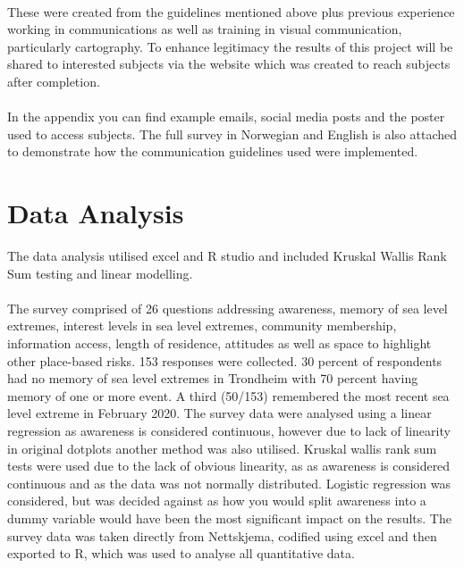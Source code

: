 \paragraph{}
These were created from the guidelines mentioned above plus previous experience working in communications as well as training in visual communication, particularly cartography. To enhance legitimacy the results of this project will be shared to interested subjects via the website which was created to reach subjects after completion. 
\paragraph{}
In the appendix you can find example emails, social media posts and the poster used to access subjects. The full survey in Norwegian and English is also attached to demonstrate how the communication guidelines used were implemented.
\paragraph{}


\section{Data Analysis}
 The data analysis utilised excel and R studio and included Kruskal Wallis Rank Sum testing and linear modelling. 
\paragraph{}
  The survey comprised of 26 questions addressing awareness, memory of sea level extremes, interest levels in sea level extremes, community membership, information access, length of residence, attitudes as well as space to highlight other place-based risks. 153 responses were collected. 30 percent of respondents had no memory of sea level extremes in Trondheim with 70 percent having memory of one or more event. A third (50/153) remembered the most recent sea level extreme in February 2020. The survey data were analysed using a linear regression as awareness is considered continuous, however due to lack of linearity in original dotplots another method was also utilised. Kruskal wallis rank sum tests were used due to the lack of obvious linearity, as as awareness is considered continuous and as the data was not normally distributed. Logistic regression was considered, but was decided against as how you would split awareness into a dummy variable would have been the most significant impact on the results. The survey data was taken directly from Nettskjema, codified using excel and then exported to R, which was used to analyse all quantitative data. 
